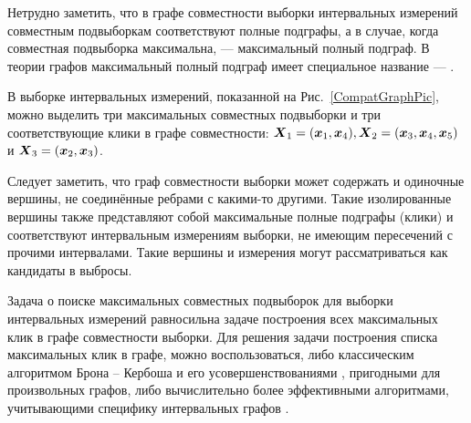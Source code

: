 \documentclass[a5paper,openany]{book}
\newcommand{\mbf}[1]{\protect\text{\boldmath$#1$}}
\begin{document}
Нетрудно заметить, что в графе совместности выборки интервальных измерений совместным 
подвыборкам соответствуют полные подграфы, а в случае, когда совместная подвыборка 
максимальна, --- максимальный полный подграф. В теории графов максимальный полный 
подграф имеет специальное название --- . 
  
В выборке интервальных измерений, показанной на Рис.~\ref{CompatGraphPic}, можно выделить 
три максимальных совместных подвыборки и три соответствующие клики в графе совместности: 
$\mbf{X}_1 = (\mbf{x}_{1},\mbf{x}_{4}), \mbf{X}_2 = (\mbf{x}_{3},\mbf{x}_{4}, \mbf{x}_{5})$ 
и $\mbf{X}_3 = (\mbf{x}_{2},\mbf{x}_{3})$. 
  
Следует заметить, что граф совместности выборки может содержать и одиночные 
вершины, не соединённые ребрами с какими-то другими. Такие изолированные вершины также
представляют собой максимальные полные подграфы (клики) и соответствуют интервальным
измерениям выборки, не имеющим пересечений с прочими интервалами. Такие вершины и 
измерения могут рассматриваться как кандидаты в выбросы.

Задача о поиске максимальных совместных подвыборок для выборки интервальных измерений 
равносильна задаче построения всех максимальных клик в графе совместности выборки. 
Для решения задачи построения списка максимальных клик в графе, можно воспользоваться, 
либо классическим алгоритмом Брона -- Кербоша и его усовершенствованиями 
\cite{Christofides, BronKerbosch, EppsteinEtAl}, пригодными для произвольных графов, 
либо вычислительно более эффективными алгоритмами, учитывающими специфику интервальных 
графов \cite{Habib}. 
\end{document}
